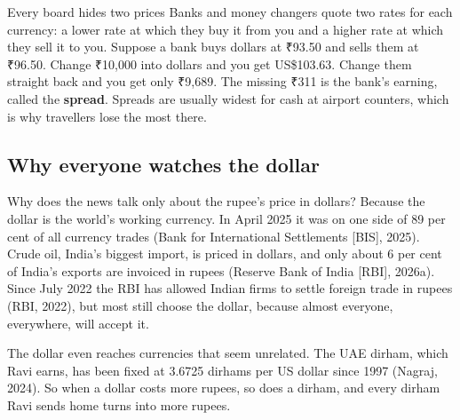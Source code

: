 \begin{didyouknow}{Every board hides two prices}
Banks and money changers quote two rates for each currency: a lower rate at which they buy it from you and a higher rate at which they sell it to you. Suppose a bank buys dollars at ₹93.50 and sells them at ₹96.50. Change ₹10,000 into dollars and you get US\$103.63. Change them straight back and you get only ₹9,689. The missing ₹311 is the bank's earning, called the \textbf{spread}. Spreads are usually widest for cash at airport counters, which is why travellers lose the most there.
\end{didyouknow}

\subsection{Why everyone watches the dollar}
Why does the news talk only about the rupee's price in dollars? Because the dollar is the world's working currency. In April 2025 it was on one side of 89 per cent of all currency trades (Bank for International Settlements [BIS], 2025). Crude oil, India's biggest import, is priced in dollars, and only about 6 per cent of India's exports are invoiced in rupees (Reserve Bank of India [RBI], 2026a). Since July 2022 the RBI has allowed Indian firms to settle foreign trade in rupees (RBI, 2022), but most still choose the dollar, because almost everyone, everywhere, will accept it.

The dollar even reaches currencies that seem unrelated. The UAE dirham, which Ravi earns, has been fixed at 3.6725 dirhams per US dollar since 1997 (Nagraj, 2024). So when a dollar costs more rupees, so does a dirham, and every dirham Ravi sends home turns into more rupees.
